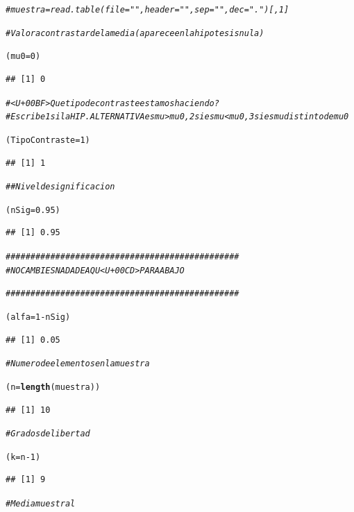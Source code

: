 \documentclass[10pt,a4paper]{article}\usepackage[]{graphicx}\usepackage[]{color}
\makeatletter
\newcommand{\hlnum}[1]{\textcolor[rgb]{0.686,0.059,0.569}{#1}}%
\newcommand{\hlcom}[1]{\textcolor[rgb]{0.678,0.584,0.686}{\textit{#1}}}%
\newcommand{\hlopt}[1]{\textcolor[rgb]{0,0,0}{#1}}%
\newcommand{\hlstd}[1]{\textcolor[rgb]{0.345,0.345,0.345}{#1}}%
\newcommand{\hlkwb}[1]{\textcolor[rgb]{0.69,0.353,0.396}{#1}}%
\newcommand{\hlkwd}[1]{\textcolor[rgb]{0.737,0.353,0.396}{\textbf{#1}}}%
\newenvironment{kframe}{%
 \def\at@end@of@kframe{}%
 \ifinner\ifhmode%
  \def\at@end@of@kframe{\end{minipage}}%
  \begin{minipage}{\columnwidth}%
 \fi\fi%
 \def\FrameCommand##1{\hskip\@totalleftmargin \hskip-\fboxsep
 \colorbox{shadecolor}{##1}\hskip-\fboxsep
     \hskip-\linewidth \hskip-\@totalleftmargin \hskip\columnwidth}%
 \MakeFramed {\advance\hsize-\width
   \@totalleftmargin\z@ \linewidth\hsize
   \@setminipage}}%
 {\par\unskip\endMakeFramed%
 \at@end@of@kframe}
\newenvironment{knitrout}{}{} %
\newcounter {cont01}
\makeatother
\begin{document}
\begin{knitrout}
\begin{kframe}
\begin{alltt}
\hlcom{#muestra = read.table(file="", header="", sep=" ",dec=".")[ , 1]}


\hlcom{# Valor a contrastar de la media (aparece en la hipotesis nula)}

\hlstd{(mu0} \hlkwb{=} \hlnum{0}\hlstd{)}
\end{alltt}
\begin{verbatim}
## [1] 0
\end{verbatim}
\begin{alltt}
\hlcom{# <U+00BF>Que tipo de contraste estamos haciendo?}
\hlcom{# Escribe 1 si la HIP. ALTERNATIVA es mu > mu0, 2 si es mu < mu0, 3 si es mu distinto de mu0}

\hlstd{(TipoContraste} \hlkwb{=} \hlnum{1}\hlstd{)}
\end{alltt}
\begin{verbatim}
## [1] 1
\end{verbatim}
\begin{alltt}
\hlcom{##Nivel de significacion}

\hlstd{(nSig} \hlkwb{=} \hlnum{0.95}\hlstd{)}
\end{alltt}
\begin{verbatim}
## [1] 0.95
\end{verbatim}
\begin{alltt}
\hlcom{###############################################}
\hlcom{# NO CAMBIES NADA DE AQU<U+00CD> PARA ABAJO}

\hlcom{###############################################}


\hlstd{(alfa} \hlkwb{=} \hlnum{1} \hlopt{-} \hlstd{nSig)}
\end{alltt}
\begin{verbatim}
## [1] 0.05
\end{verbatim}
\begin{alltt}
\hlcom{# Numero de elementos en la muestra}

\hlstd{(n} \hlkwb{=} \hlkwd{length}\hlstd{(muestra))}
\end{alltt}
\begin{verbatim}
## [1] 10
\end{verbatim}
\begin{alltt}
\hlcom{# Grados de libertad}

\hlstd{(k} \hlkwb{=} \hlstd{n} \hlopt{-} \hlnum{1}\hlstd{)}
\end{alltt}
\begin{verbatim}
## [1] 9
\end{verbatim}
\begin{alltt}
\hlcom{# Media muestral}


\end{alltt}
\end{kframe}
\end{knitrout}
\end{document}
